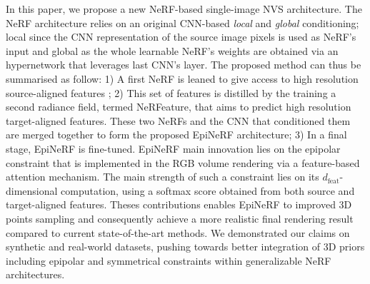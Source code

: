 In this paper, we propose a new NeRF-based single-image NVS architecture. The NeRF architecture relies on an original CNN-based \textit{local} and \textit{global} conditioning; local since the CNN representation of the source image pixels is used as NeRF's input and global as the whole learnable NeRF's weights are obtained via an hypernetwork that leverages last CNN's layer. The proposed method can thus be summarised as follow: 1) A first NeRF is leaned to give access to high resolution source-aligned features ; 2) This set of features is distilled by the training a second radiance field, termed NeRFeature, that aims to predict high resolution target-aligned features. These two NeRFs and the CNN that conditioned them are merged together to form the proposed EpiNeRF architecture; 3) In a final stage, EpiNeRF is fine-tuned. EpiNeRF main innovation lies on the epipolar constraint that is implemented in the RGB volume rendering via a feature-based attention mechanism. The main strength of such a constraint lies on its $d_{\text{feat}}$-dimensional computation, using a softmax score obtained from both source and target-aligned features. Theses contributions enables EpiNeRF to improved 3D points sampling and consequently achieve a more realistic final rendering result compared to current state-of-the-art methods. We demonstrated our claims on synthetic and real-world datasets, pushing towards better integration of 3D priors including epipolar and symmetrical constraints within generalizable NeRF architectures. 
  






